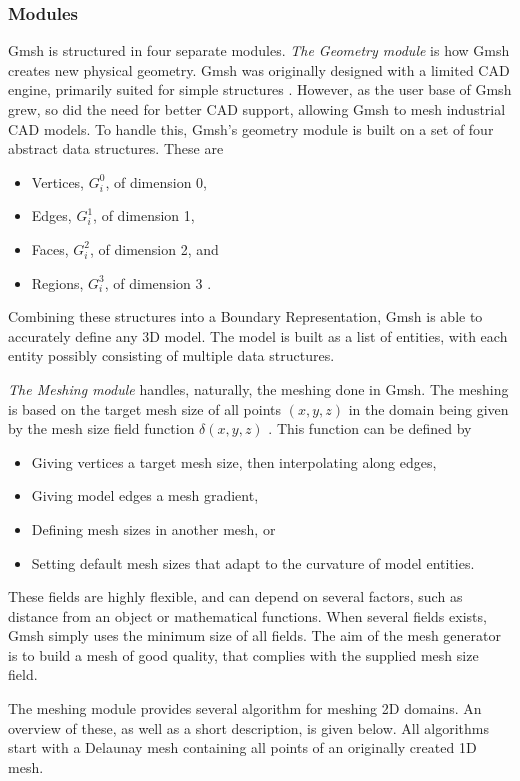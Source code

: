 \subsubsection{Modules}
Gmsh is structured in four separate modules. \emph{The Geometry module} is how Gmsh creates new physical geometry. Gmsh was originally designed with a limited CAD engine, primarily suited for simple structures \cite{Gmsh_article}. However, as the user base of Gmsh grew, so did the need for better CAD support, allowing Gmsh to mesh industrial CAD models. To handle this, Gmsh's geometry module is built on a set of four abstract data structures. These are
\begin{itemize}
    \item Vertices, $G_i^0$, of dimension 0,
    \item Edges, $G_i^1$, of dimension 1,
    \item Faces, $G_i^2$, of dimension 2, and
    \item Regions, $G_i^3$, of dimension 3 \cite{Gmsh_article}.
\end{itemize}
Combining these structures into a Boundary Representation, Gmsh is able to accurately define any 3D model. The model is built as a list of entities, with each entity possibly consisting of multiple data structures.

\emph{The Meshing module} handles, naturally, the meshing done in Gmsh. The meshing is based on the target mesh size of all points $(x, y, z)$ in the domain being given by the mesh size field function $\delta(x, y, z)$ \cite{Gmsh_article}. This function can be defined by
\begin{itemize}
    \item Giving vertices a target mesh size, then interpolating along edges,
    \item Giving model edges a mesh gradient,
    \item Defining mesh sizes in another mesh, or
    \item Setting default mesh sizes that adapt to the curvature of model entities.
\end{itemize}
These fields are highly flexible, and can depend on several factors, such as distance from an object or mathematical functions. When several fields exists, Gmsh simply uses the minimum size of all fields. The aim of the mesh generator is to build a mesh of good quality, that complies with the supplied mesh size field.

The meshing module provides several algorithm for meshing 2D domains. An overview of these, as well as a short description, is given below. All algorithms start with a Delaunay mesh containing all points of an originally created 1D mesh.

